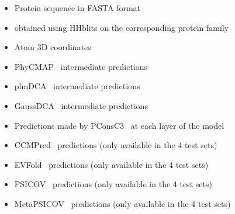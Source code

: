    \begin{itemize}
      \item Protein sequence in FASTA format
      \item {} obtained using HHblits on the corresponding protein family
      \item Atom 3D coordinates
      \item PhyCMAP~\cite{PhyCMap} intermediate predictions
      \item plmDCA~\cite{EKEBERG2014341} intermediate predictions
      \item GaussDCA~\cite{10.1371/journal.pone.0092721} intermediate predictions
      \item Predictions made by PConsC3~\cite{Skwark079673} at each layer of the model
      \item CCMPred~\cite{CCMPred} predictions (only available in the 4 test sets)
      \item EVFold~\cite{Sheridan021022} predictions (only available in the 4 test sets)
      \item PSICOV~\cite{doi:10.1093/bioinformatics/btr638} predictions (only available in the 4 test sets)
      \item MetaPSICOV~\cite{MetaPSICOV} predictions (only available in the 4 test sets)
    \end{itemize}


